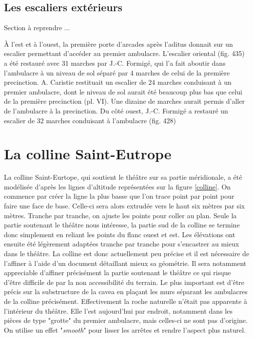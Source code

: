 \subsection{Les escaliers extérieurs}

Section à reprendre ...

\`{A} l'est et à l'ouest, la première porte d'arcades après l'\gls{aditus} donnait sur un escalier permettant d'accéder au premier \gls{ambulacre}. L'escalier oriental (fig. 435) a été restauré avec 31 marches par J.-C. Formigé, qui l'a fait aboutir dans l'\gls{ambulacre} à un niveau de sol séparé par 4 marches de celui de la première  \gls{precinction}. A. Caristie restituait un escalier de 24 marches conduisant à un premier \gls{ambulacre}, dont le niveau de sol aurait été beaucoup plus bas que celui de la première  \gls{precinction} (pl. VI). Une dizaine de
marches aurait permis d'aller de l'\gls{ambulacre} à la  \gls{precinction}.
Du côté ouest, J.-C. Formigé a restauré un escalier de 32 marches conduisant à
l'\gls{ambulacre} (fig. 428)


\section{La colline Saint-Eutrope} 
La colline Saint-Eurtope, qui soutient le théâtre sur sa partie méridionale, a été modélisée d'après les lignes d'altitude représentées sur la figure \ref{colline}. On commence par créer la ligne la plus basse que l'on trace point par point pour faire une face de base. Celle-ci sera alors extrudée vers le haut six mètres par six mètres. Tranche par tranche, on ajuste les points pour coller au plan. Seule la partie soutenant le théâtre nous intéresse, la partie sud de la colline se termine donc simplement en reliant les points du flanc ouest et est. Les élévations ont ensuite été légèrement adaptées tranche par tranche pour s'encastrer au mieux dans le théâtre. La colline est donc actuellement peu précise et il est nécessaire de l'affiner à l'aide d'un document détaillant mieux sa géométrie. Il sera notamment appreciable d'affiner précisément la partie soutenant le théâtre ce qui risque d'être difficile de par la non accessibilité du terrain. Le plus important est d'être précis sur la substructure de la  \gls{cavea} en plaçant les murs séparant les  \glspl{ambulacre} de la colline précisément. Effectivement la roche naturelle n'était pas apparente à l'intérieur du théâtre. Elle l'est aujourd'hui par endroit, notamment dans les pièces de type "grotte" du premier \gls{ambulacre}, mais celles-ci ne sont pas d'origine. On utilise un effet "\textit{smooth}" pour lisser les arrêtes et rendre l'aspect plus naturel.

